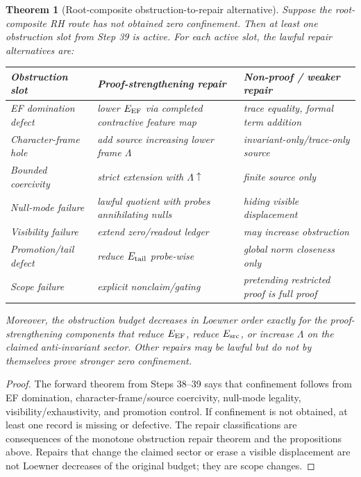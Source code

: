 \documentclass[11pt]{article}
\newtheorem{theorem}{Theorem}[section]
\newcommand{\EEF}{E_{\rm EF}}
\newcommand{\Esrc}{E_{\rm src}}
\begin{document}
\begin{theorem}[Root-composite obstruction-to-repair alternative]
Suppose the root-composite RH route has not obtained zero confinement.  Then at least one obstruction slot from Step 39 is active.  For each active slot, the lawful repair alternatives are:
\begin{center}
\begin{tabular}{lll}
\toprule
Obstruction slot & Proof-strengthening repair & Non-proof / weaker repair\\
\midrule
EF domination defect & lower $\EEF$ via completed contractive feature map & trace equality, formal term addition\\
Character-frame hole & add source increasing lower frame $\Lambda$ & invariant-only/trace-only source\\
Bounded coercivity & strict extension with $\Lambda\uparrow$ & finite source only\\
Null-mode failure & lawful quotient with probes annihilating nulls & hiding visible displacement\\
Visibility failure & extend zero/readout ledger & may increase obstruction\\
Promotion/tail defect & reduce $E_{\rm tail}$ probe-wise & global norm closeness only\\
Scope failure & explicit nonclaim/gating & pretending restricted proof is full proof\\
\bottomrule
\end{tabular}
\end{center}
Moreover, the obstruction budget decreases in Loewner order exactly for the proof-strengthening components that reduce $\EEF$, reduce $\Esrc$, or increase $\Lambda$ on the claimed anti-invariant sector.  Other repairs may be lawful but do not by themselves prove stronger zero confinement.
\end{theorem}

\begin{proof}
The forward theorem from Steps 38--39 says that confinement follows from EF domination, character-frame/source coercivity, null-mode legality, visibility/exhaustivity, and promotion control.  If confinement is not obtained, at least one record is missing or defective.  The repair classifications are consequences of the monotone obstruction repair theorem and the propositions above.  Repairs that change the claimed sector or erase a visible displacement are not Loewner decreases of the original budget; they are scope changes.
\end{proof}
\end{document}
